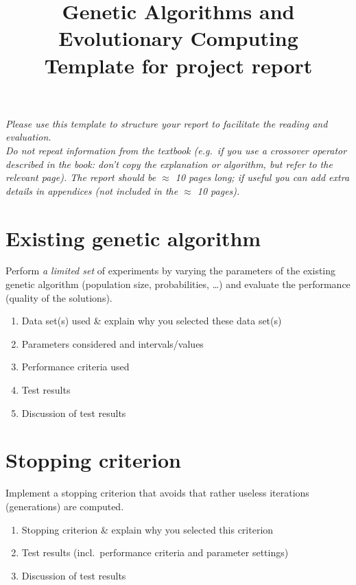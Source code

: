 \documentclass[a4paper,11pt]{article}
\title{Genetic Algorithms and Evolutionary Computing\\
Template for project report}
\date{}
\author{}
\begin{document}
\maketitle

\noindent
\emph{Please use this template to structure your report to facilitate the reading and evaluation.\\
Do not repeat information from the textbook (e.g.\ if you use a crossover operator described in the book: don't copy the explanation or algorithm, but refer to the relevant page).
The report should be $\approx$ 10 pages long; if useful you can add extra details in appendices (not included in the $\approx$ 10 pages).}
\section{Existing genetic algorithm}

Perform \emph{a limited set} of experiments by varying the parameters of the existing genetic algorithm (population size, probabilities, \ldots) and evaluate the performance (quality of the solutions).
\begin{enumerate}

\item Data set(s) used  \& explain why you selected these data set(s)
\item Parameters considered and intervals/values
\item  Performance criteria used
\item Test results 
\item Discussion of test results

\end{enumerate}

\section{Stopping criterion}
Implement a stopping criterion that avoids that rather useless iterations (generations) are computed.
\begin{enumerate}
\item	 Stopping criterion \& explain why you selected this criterion
\item Test results (incl.\ performance criteria and parameter settings)
\item Discussion of test results

\end{enumerate}
\end{document}
